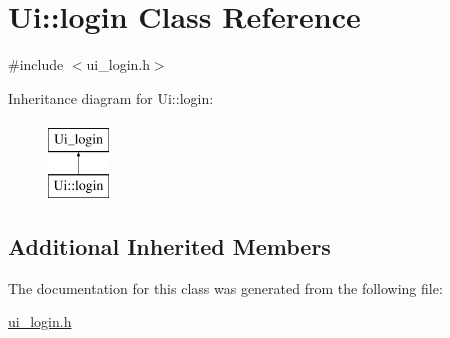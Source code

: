 \hypertarget{classUi_1_1login}{\section{Ui\-:\-:login Class Reference}
\label{classUi_1_1login}
}


{\ttfamily \#include $<$ui\-\_\-login.\-h$>$}

Inheritance diagram for Ui\-:\-:login\-:\begin{figure}[H]
\begin{center}
\leavevmode
\includegraphics[height=2.000000cm]{classUi_1_1login}
\end{center}
\end{figure}
\subsection*{Additional Inherited Members}


The documentation for this class was generated from the following file\-:\begin{DoxyCompactItemize}
\item 
\hyperlink{ui__login_8h}{ui\-\_\-login.\-h}\end{DoxyCompactItemize}
